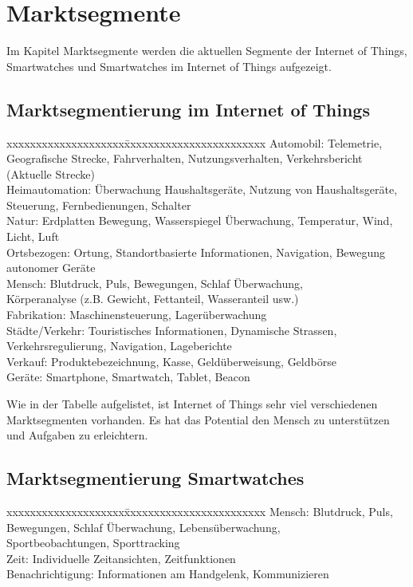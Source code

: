 \chapter{Marktsegmente}
Im Kapitel Marktsegmente werden die aktuellen Segmente der Internet of Things, Smartwatches und Smartwatches im Internet of Things aufgezeigt.\\

\section{Marktsegmentierung im Internet of Things}
\begin{tabbing}
xxxxxxxxxxxxxxxxxxxx\=xxxxxxxxxxxxxxxxxxxxxxxx	\kill
Automobil: 		   \>  Telemetrie, Geografische Strecke, Fahrverhalten, Nutzungsverhalten, Verkehrsbericht (Aktuelle Strecke) \\
Heimautomation:	 \>  Überwachung Haushaltsgeräte, Nutzung von Haushaltsgeräte, Steuerung, Fernbedienungen, Schalter \\
Natur:			     \>  Erdplatten Bewegung, Wasserspiegel Überwachung, Temperatur, Wind, Licht, Luft \\
Ortsbezogen:		 \>  Ortung, Standortbasierte Informationen, Navigation, Bewegung autonomer Geräte \\
Mensch:          \>  Blutdruck, Puls, Bewegungen, Schlaf Überwachung, \\\>Körperanalyse {(z.B. Gewicht, Fettanteil, Wasseranteil usw.)} \\
Fabrikation:		 \>  Maschinensteuerung, Lagerüberwachung \\
Städte{/}Verkehr:\>  Touristisches Informationen, Dynamische Strassen, Verkehrsregulierung, Navigation, Lageberichte \\
Verkauf:		     \>  Produktebezeichnung, Kasse, Geldüberweisung, Geldbörse \\
Geräte:		       \>  Smartphone, Smartwatch, Tablet, Beacon \\
\end{tabbing}

Wie in der Tabelle aufgelistet, ist Internet of Things sehr viel verschiedenen Marktsegmenten vorhanden.
Es hat das Potential den Mensch zu unterstützen und Aufgaben zu erleichtern.
\section{Marktsegmentierung Smartwatches}
\begin{tabbing}
xxxxxxxxxxxxxxxxxxxx\=xxxxxxxxxxxxxxxxxxxxxxxx	\kill
Mensch:		          \> Blutdruck, Puls, Bewegungen, Schlaf Überwachung, Lebensüberwachung, \\\>Sportbeobachtungen, Sporttracking \\
Zeit:			          \> Individuelle Zeitansichten, Zeitfunktionen \\
Benachrichtigung:	  \> Informationen am Handgelenk, Kommunizieren \\
\end{tabbing}
